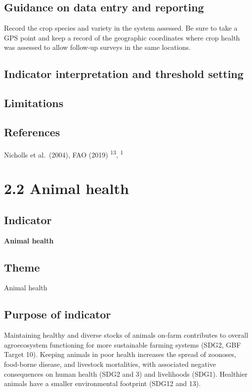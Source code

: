 \documentclass[
  letterpaper,
  DIV=11,
  numbers=noendperiod]{scrreprt}
\begin{document}
\section{Guidance on data entry and
reporting}\label{guidance-on-data-entry-and-reporting}

Record the crop species and variety in the system assessed. Be sure to
take a GPS point and keep a record of the geographic coordinates where
crop health was assessed to allow follow-up surveys in the same
locations.

\section{Indicator interpretation and threshold
setting}\label{indicator-interpretation-and-threshold-setting}

\section{Limitations}\label{limitations}

\section{References}\label{references}

Nicholls et al.~(2004), FAO (2019) \textsuperscript{13},
\textsuperscript{1}

\chapter{2.2 Animal health}\label{animal-health}

\section{Indicator}\label{indicator-1}

\textbf{Animal health}

\section{Theme}\label{theme-1}

Animal health

\section{Purpose of indicator}\label{purpose-of-indicator-1}

Maintaining healthy and diverse stocks of animals on-farm contributes to
overall agroecosystem functioning for more sustainable farming systems
(SDG2, GBF Target 10). Keeping animals in poor health increases the
spread of zoonoses, food-borne disease, and livestock mortalities, with
associated negative consequences on human health (SDG2 and 3) and
livelihoods (SDG1). Healthier animals have a smaller environmental
footprint (SDG12 and 13).
\end{document}
